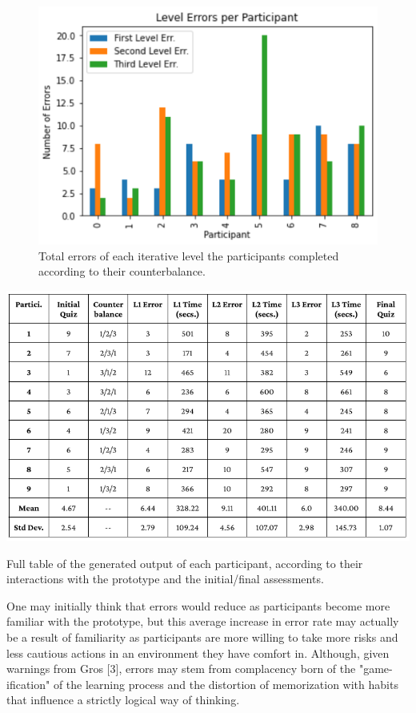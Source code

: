 \documentclass{vgtc}                          %
\begin{document}
\begin{figure}[tb]
 \centering 
 \includegraphics[width=\linewidth]{LevelErrorsParticipants.png}
 \caption{Total errors of each iterative level the participants completed according to their counterbalance.}
 \label{fig:sample}
\end{figure}

\begin{table}[tb]
 \centering 
 \includegraphics[width=\linewidth]{PerformanceTable.png}
 \caption{Full table of the generated output of each participant, according to their interactions with the prototype and the initial/final assessments.}
 \label{fig:sample}
\end{table}

One may initially think that errors would reduce as participants become more familiar with the prototype, but this average increase in error rate may actually be a result of familiarity as participants are more willing to take more risks and less cautious actions in an environment they have comfort in. Although, given warnings from Gros [3], errors may stem from complacency born of the "game-ification" of the learning process and the distortion of memorization with habits that influence a strictly logical way of thinking.
\end{document}

